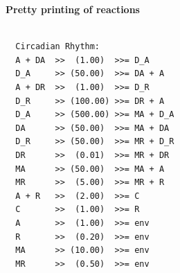\documentclass[a4paper]{article}
\begin{document}
\vspace{2em}  

\noindent\large\textbf{Pretty printing of reactions}
\begin{verbatim}

  Circadian Rhythm:
  A + DA  >>  (1.00)  >>= D_A
  D_A     >> (50.00)  >>= DA + A
  A + DR  >>  (1.00)  >>= D_R
  D_R     >> (100.00) >>= DR + A
  D_A     >> (500.00) >>= MA + D_A
  DA      >> (50.00)  >>= MA + DA
  D_R     >> (50.00)  >>= MR + D_R
  DR      >>  (0.01)  >>= MR + DR
  MA      >> (50.00)  >>= MA + A
  MR      >>  (5.00)  >>= MR + R
  A + R   >>  (2.00)  >>= C
  C       >>  (1.00)  >>= R
  A       >>  (1.00)  >>= env
  R       >>  (0.20)  >>= env
  MA      >> (10.00)  >>= env
  MR      >>  (0.50)  >>= env
\end{verbatim}
\end{document}

